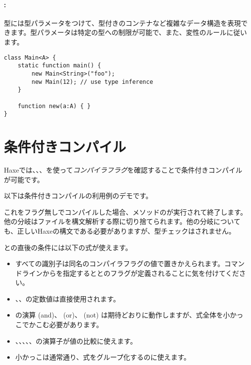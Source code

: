 \paragraph{:}

型には型パラメータをつけて、型付きのコンテナなど複雑なデータ構造を表現できます。型パラメータは特定の型への制限が可能で、また、変性のルールに従います。

\begin{lstlisting}
class Main<A> {
    static function main() {
        new Main<String>("foo");
        new Main(12); // use type inference
    }

    function new(a:A) { }
}
\end{lstlisting}

\section{条件付きコンパイル}
\label{lf-condition-compilation}

Haxeでは、、、を使って\emph{コンパイラフラグ}を確認することで条件付きコンパイルが可能です。


以下は条件付きコンパイルの利用例のデモです。


これをフラグ無しでコンパイルした場合、メソッドのが実行されて終了します。他の分岐はファイルを構文解析する際に切り捨てられます。他の分岐についても、正しいHaxeの構文である必要がありますが、型チェックはされません。

との直後の条件には以下の式が使えます。

\begin{itemize}
	\item すべての識別子は同名のコンパイラフラグの値で置きかえられます。コマンドラインからを指定するととのフラグが定義されることに気を付けてください。
	\item {}、、の定数値は直接使用されます。
		\item {}の演算\expr{\&\&} (and)、\expr{||} (or)、\expr{!} (not) は期待どおりに動作しますが、式全体を小かっこでかこむ必要があります。
	\item \expr{==}、\expr{!=}、\expr{>}、\expr{>=}、\expr{<}、\expr{<=}の演算子が値の比較に使えます。
	\item 小かっこ\expr{()}は通常通り、式をグループ化するのに使えます。
\end{itemize}


